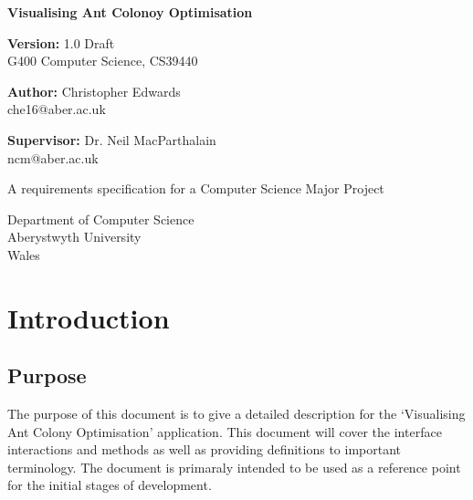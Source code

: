 \documentclass[10pt,a4paper]{article}
\begin{document}
\begin{titlepage}
    \begin{center}
        \vspace{1cm}
        
        \Huge
        \textbf{Visualising Ant Colonoy Optimisation}
        
	 \vspace{0.5cm}
        \Large
	 \textbf{Version:} 1.0 Draft \\
        G400  Computer Science, CS39440
	  

        \vspace{1.0cm}
        
	  \Large
        \textbf{Author:} Christopher Edwards \\
         che16@aber.ac.uk

 	  \vspace{0.8cm}
 	  \textbf{Supervisor:} Dr. Neil MacParthalain \\
         ncm@aber.ac.uk
        
        \vspace{3.0cm}
        
        A requirements  specification for a Computer Science Major Project
                
        \vspace{0.8cm}
                
        \Large
        Department of Computer Science\\
        Aberystwyth University\\
        Wales\\
        
        
	\end{center}
\end{titlepage}


\section{Introduction}

\subsection{Purpose}

The purpose of this document is to give a detailed description for the `Visualising Ant Colony Optimisation' application. This document will cover the interface interactions and methods as well as providing definitions to important terminology. The document is primaraly intended to be used as a reference point for the initial stages of development.
\end{document}
